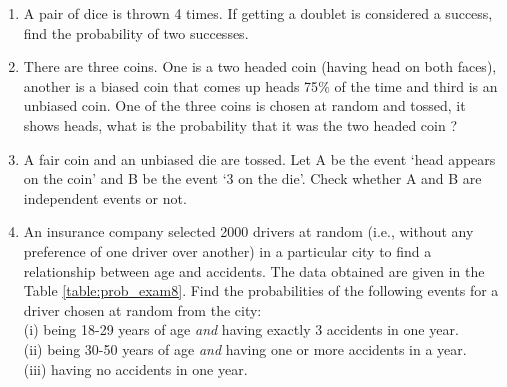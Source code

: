 

\renewcommand{\theequation}{\theenumi}
\begin{enumerate}[label=\arabic*.,ref=\thesubsection.\theenumi]

\item A pair of dice is thrown 4 times. If getting a doublet is considered a success, find the probability of two successes.\\
\item There are three coins. One is a two headed coin (having head on both faces), another is a biased coin that comes up heads 75$\%$ of the time and third is an unbiased coin. One of the three coins is chosen at random and tossed, it shows heads, what is the probability that it was the two headed coin ?\\

\item A fair coin and an unbiased die are tossed. Let A be the event ‘head appears on
the coin’ and B be the event ‘3 on the die’. Check whether A and B are independent events or not.\\\item An insurance company selected 2000 drivers at random (i.e., without
any preference of one driver over another) in a particular city to find a relationship between age and accidents. The data obtained are given in the Table \ref{table:prob_exam8}.
Find the probabilities of the following events for a driver chosen at random from the city:\\
(i) being 18-29 years of age \textit{and} having exactly 3 accidents in one year.\\
(ii) being 30-50 years of age \textit{and} having one or more accidents in a year.\\
(iii) having no accidents in one year.\\
\begin{table}[!ht]
\centering
{}
\caption{}
\label{table:prob_exam8}
\end{table}


\end{enumerate}

